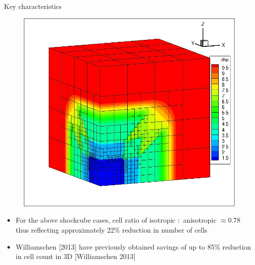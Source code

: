 \documentclass{beamer}
\begin{document}
\begin{frame}
\begin{minipage}[t][1\textheight]{1\textwidth}
\begin{exampleblock}{Key characteristics}
\begin{figure}
{\includegraphics[width=0.6\textheight, trim=0cm 0cm 0 0cm,clip=true]{./figs/shockCubeIso3.jpg}}
\end{figure}
\vspace{-15pt}
\begin{itemize}
\tiny
\item For the above shockcube cases, cell ratio of isotropic $:$ anisotropic $\approx 0.78$ thus reflecting approximately $22 \%$ reduction in number of cells
\item Williamschen [2013] have previously obtained savings of up to 85\% reduction in cell count in 3D [Williamschen 2013]
\end{itemize}
\end{exampleblock}
\end{minipage}

\end{frame}

\end{document}
